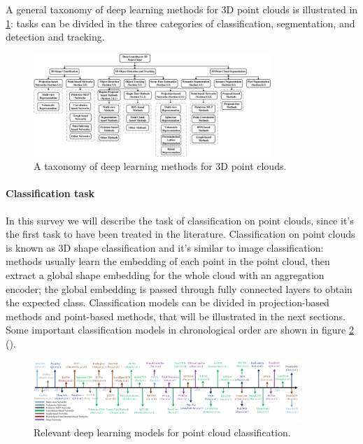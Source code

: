 A general taxonomy of deep learning methods for 3D point clouds is illustrated in \ref{fig:taxonomy_point_clouds}: tasks can be divided in the three categories of classification, segmentation, and detection and tracking.

\begin{figure}[ht]
    \centering
    \includegraphics[width=0.8\textwidth]{images/taxonomy_point_clouds.png}
    \caption{A taxonomy of deep learning methods for 3D point clouds.}
    \label{fig:taxonomy_point_clouds}
\end{figure}

\paragraph{Classification task}

In this survey we will describe the task of classification on point clouds, since it's the first task to have been treated in the literature. Classification on point clouds is known as 3D shape classification and it's similar to image classification: methods usually learn the embedding of each point in the point cloud, then extract a global shape embedding for the whole cloud with an aggregation encoder; the global embedding is passed through fully connected layers to obtain the expected class. Classification models can be divided in projection-based methods and point-based methods, that will be illustrated in the next sections. Some important classification models in chronological order are shown in figure \ref{fig:chrono_deep} (\cite{guo2020deep}).

\begin{figure}[ht]
    \centering
    \includegraphics[width=0.9\textwidth]{images/chrono_deep.png}
    \caption{Relevant deep learning models for point cloud classification.}
    \label{fig:chrono_deep}
\end{figure}

